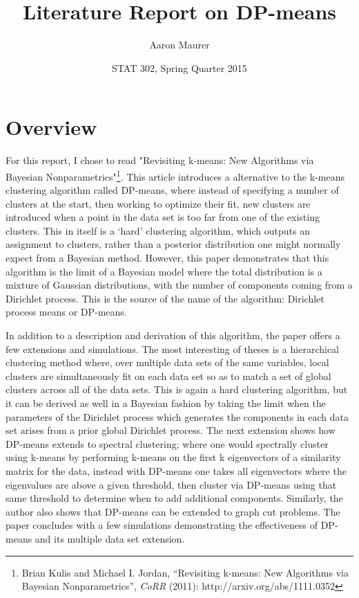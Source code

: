 \documentclass[11pt]{article}
\theoremstyle{definition}
\begin{document}
\title{Literature Report on DP-means}
\author{Aaron Maurer}
\date{STAT 302, Spring Quarter 2015}
\maketitle
\section{Overview}
For this report, I chose to read "Revisiting k-means: New Algorithms via Bayesian Nonparametrics"\footnote{Brian Kulis and Michael I. Jordan, ``Revisiting k-means: New Algorithms via Bayesian Nonparametrics'', \textit{CoRR} (2011): http://arxiv.org/abs/1111.0352}. This article introduces a alternative to the k-means clustering algorithm called DP-means, where instead of specifying a number of clusters at the start, then working to optimize their fit, new clusters are introduced when a point in the data set is too far from one of the existing clusters. This in itself is a `hard' clustering algorithm, which outputs an assignment to clusters, rather than a posterior distribution one might normally expect from a Bayesian method. However, this paper demonstrates that this algorithm is the limit of a Bayesian model where the total distribution is a mixture of Gaussian distributions, with the number of components coming from a Dirichlet process. This is the source of the name of the algorithm: Dirichlet process means or DP-means. \par
In addition to a description and derivation of this algorithm, the paper offers a few extensions and simulations. The most interesting of theses is a hierarchical clustering method where, over multiple data sets of the same variables, local clusters are simultaneously fit on each data set so as to match a set of global clusters across all of the data sets. This is again a hard clustering algorithm, but it can be derived as well in a Bayesian fashion by taking the limit when the parameters of the Dirichlet process which generates the components in each data set arises from a prior global Dirichlet process. The next extension shows how DP-means extends to spectral clustering; where one would spectrally cluster using k-means by performing k-means on the first k eigenvectors of a similarity matrix for the data, instead with DP-means one takes all eigenvectors where the eigenvalues are above a given threshold, then cluster via DP-means using that same threshold to determine when to add additional components. Similarly, the author also shows that DP-means can be extended to graph cut problems. The paper concludes with a few simulations demonstrating the effectiveness of DP-means and its multiple data set extension. \par
\end{document}
